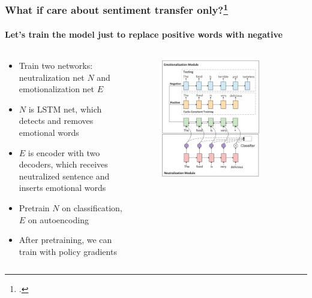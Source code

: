 \documentclass[10pt]{beamer}
\begin{document}
\begin{frame}
\frametitle{What if care about sentiment transfer only?\footcite{SentimentTransferWithRL}}
\framesubtitle{Let's train the model just to replace positive words with negative}
\begin{columns}
\begin{column}{6cm}
\begin{itemize}
    \item Train two networks: neutralization net $N$ and emotionalization net $E$
    \item $N$ is LSTM net, which detects and removes emotional words
    \item $E$ is encoder with two decoders, which receives neutralized sentence and inserts emotional words
    \item Pretrain $N$ on classification, $E$ on autoencoding
    \item After pretraining, we can train with policy gradients
\end{itemize}
\end{column}

\begin{column}{6cm}
\begin{figure}
\centering
\includegraphics[width=0.8\textwidth]{images/rl-sentiment-transfer}
\end{figure}
\end{column}
\end{columns}

\end{frame}
\end{document}
